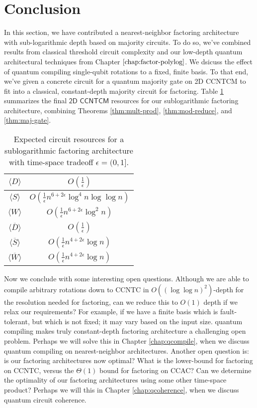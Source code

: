 \section{Conclusion}
\label{sec:fsl-conclude}

In this section, we have contributed a nearest-neighbor factoring architecture with
sub-logarithmic depth based on majority circuits. To do so, we've combined results from classical threshold
circuit complexity and our low-depth quantum architectural techniques from
Chapter $\ref{chap:factor-polylog}$.
We dsicuss the effect of quantum compiling single-qubit rotations to a fixed, finite basis.
To that end, we've given a concrete circuit for
a quantum majority gate on \textsf{2D CCNTCM} to fit into a classical, constant-depth majority circuit
for factoring. Table \ref{tab:sublog-resources} summarizes the final $\textsf{2D CCNTCM}$ resources for our sublogarithmic
factoring architecture, combining Theorems \ref{thm:mult-prod}, \ref{thm:mod-reduce}, and \ref{thm:maj-gate}.

\begin{table}[htb!]
\begin{tabular}{c|c|}
\hline
$\langle D \rangle$ & $O(\frac{1}{\epsilon})$ \\
\hline
$\langle S \rangle$ & $O(\frac{1}{\epsilon}n^{6 + 2\epsilon}\log^4 n\log\log n)$ \\
\hline
$\langle W \rangle$ & $O(\frac{1}{\epsilon}n^{6 + 2\epsilon}\log^2 n)$ \\
\hline
$\langle \overline{D} \rangle$ & $O(\frac{1}{\epsilon})$ \\
\hline
$\langle \overline{S} \rangle$ & $O(\frac{1}{\epsilon}n^{4+2\epsilon}\log n)$ \\
\hline
$\langle \overline{W} \rangle$ & $O(\frac{1}{\epsilon}n^{4+2\epsilon}\log n)$ \\
\hline
\end{tabular}
\caption{Expected circuit resources for a sublogarithmic factoring architecture with time-space tradeoff $\epsilon = (0,1]$.}
\label{tab:sublog-resources}
\end{table}

Now we conclude with some interesting open questions.
Although we are able to compile arbitrary rotations down to \textsf{CCNTC} in $O((\log \log n)^2)$-depth
for the resolution needed for factoring, can we reduce this to $O(1)$ depth if we relax our
requirements? For example, if we have a finite basis which is fault-tolerant, but which is not fixed;
it may vary based on the input size. quantum compiling makes truly constant-depth factoring architecture a challenging
open problem. Perhaps we will solve this in Chapter \ref{chap:qcompile}, when we discuss quantum compiling on
nearest-neighbor architectures.
Another open question is: is our factoring architectures now optimal?
What is the lower-bound for factoring on \textsf{CCNTC}, versus the $\Theta(1)$ bound for factoring on \textsf{CCAC}?
Can we determine the optimality of our factoring architectures using some other time-space product?
Perhaps we will this in Chapter \ref{chap:qcoherence}, when we discuss quantum circuit coherence. 

